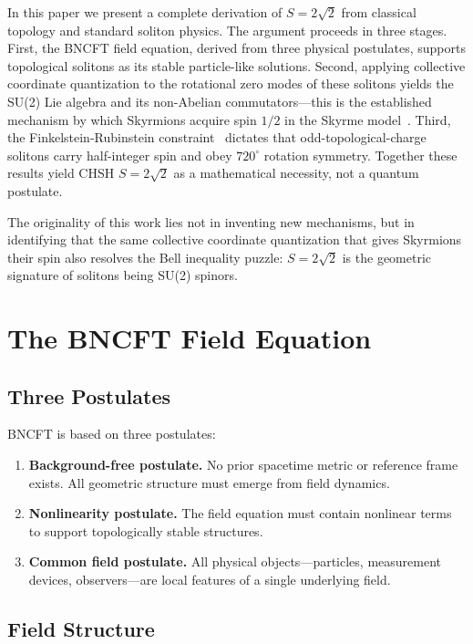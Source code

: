\documentclass[11pt,a4paper]{article}
\begin{document}
In this paper we present a complete derivation of $S = 2\sqrt{2}$ from classical topology and standard soliton physics. The argument proceeds in three stages. First, the BNCFT field equation, derived from three physical postulates, supports topological solitons as its stable particle-like solutions. Second, applying collective coordinate quantization to the rotational zero modes of these solitons yields the SU(2) Lie algebra and its non-Abelian commutators---this is the established mechanism by which Skyrmions acquire spin $1/2$ in the Skyrme model~\cite{skyrme1962,anw1983}. Third, the Finkelstein-Rubinstein constraint~\cite{fr1968} dictates that odd-topological-charge solitons carry half-integer spin and obey $720^\circ$ rotation symmetry. Together these results yield CHSH $S = 2\sqrt{2}$ as a mathematical necessity, not a quantum postulate.

The originality of this work lies not in inventing new mechanisms, but in identifying that the same collective coordinate quantization that gives Skyrmions their spin also resolves the Bell inequality puzzle: $S = 2\sqrt{2}$ is the geometric signature of solitons being SU(2) spinors.

\section{The BNCFT Field Equation}

\subsection{Three Postulates}

BNCFT is based on three postulates:

\begin{enumerate}
\item \textbf{Background-free postulate.} No prior spacetime metric or reference frame exists. All geometric structure must emerge from field dynamics.
\item \textbf{Nonlinearity postulate.} The field equation must contain nonlinear terms to support topologically stable structures.
\item \textbf{Common field postulate.} All physical objects---particles, measurement devices, observers---are local features of a single underlying field.
\end{enumerate}

\subsection{Field Structure}
\end{document}
